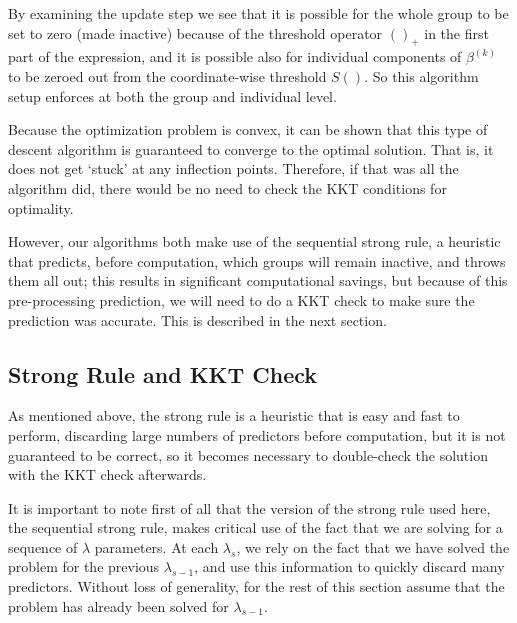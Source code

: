 \documentclass[12pt]{article}
\begin{document}
By examining the update step we see that it is possible for the whole group to be set to zero (made inactive) because of the threshold operator $()_+$ in the first part of the expression, and it is possible also for individual components of $\beta^{(k)}$ to be zeroed out from the coordinate-wise threshold $S()$. So this algorithm setup enforces at both the group and individual level.

Because the optimization problem is convex, it can be shown that this type of descent algorithm is guaranteed to converge to the optimal solution. That is, it does not get `stuck' at any inflection points. Therefore, if that was all the algorithm did, there would be no need to check the KKT conditions for optimality. 

However, our algorithms both make use of the sequential strong rule, a heuristic that predicts, before computation, which groups will remain inactive, and throws them all out; this results in significant computational savings, but because of this pre-processing prediction, we will need to do a KKT check \citep{boyd2004convex} to make sure the prediction was accurate. This is described in the next section.

\subsection{Strong Rule and KKT Check}

As mentioned above, the strong rule \citep{tibshirani2012strong} is a heuristic that is easy and fast to perform, discarding large numbers of predictors before computation, but it is not guaranteed to be correct, so it becomes necessary to double-check the solution with the KKT check afterwards. 

It is important to note first of all that the version of the strong rule used here, the sequential strong rule, makes critical use of the fact that we are solving for a sequence of $\lambda$ parameters. At each $\lambda_s$, we rely on the fact that we have solved the problem for the previous $\lambda_{s-1}$, and use this information to quickly discard many predictors. Without loss of generality, for the rest of this section assume that the problem has already been solved for $\lambda_{s-1}$.
\end{document}
